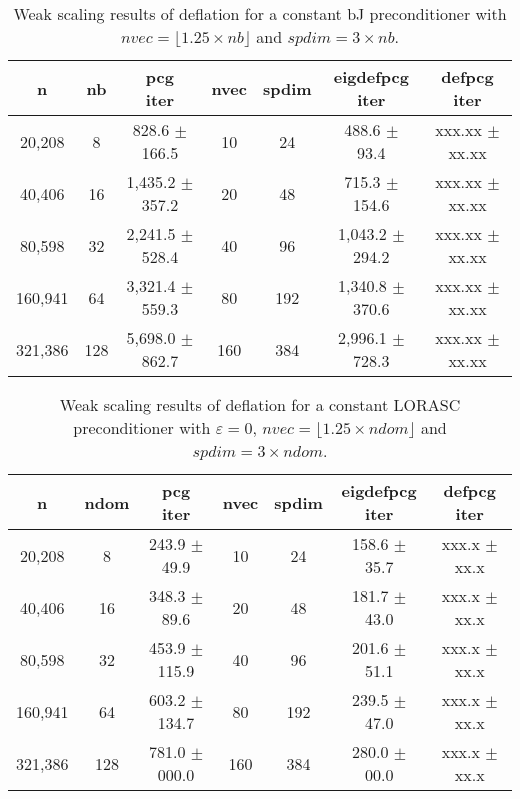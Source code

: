 \documentclass{article}
\begin{document}
\begin{table}[ht]
	\caption{Weak scaling results of deflation for a constant bJ preconditioner with $nvec=\lfloor1.25\times nb\rfloor$ and $spdim=3\times nb$.}
	\centering
	\begin{tabular}{|c|c|c|c|c|c|c|}
		\hline
		n & nb & \makecell{pcg\\ iter} & nvec & spdim & \makecell{eigdefpcg\\ iter} & \makecell{defpcg\\ iter}\\
		\hline
		20,208  &   8 &   828.6 $\pm$ 166.5 &  10 &  24 &   488.6 $\pm$  93.4 & xxx.xx $\pm$ xx.xx \\
		40,406  &  16 & 1,435.2 $\pm$ 357.2 &  20 &  48 &   715.3 $\pm$ 154.6 & xxx.xx $\pm$ xx.xx \\
		80,598  &  32 & 2,241.5 $\pm$ 528.4 &  40 &  96 & 1,043.2 $\pm$ 294.2 & xxx.xx $\pm$ xx.xx \\
		160,941 &  64 & 3,321.4 $\pm$ 559.3 &  80 & 192 & 1,340.8 $\pm$ 370.6 & xxx.xx $\pm$ xx.xx \\
		321,386 & 128 & 5,698.0 $\pm$ 862.7 & 160 & 384 & 2,996.1 $\pm$ 728.3 & xxx.xx $\pm$ xx.xx \\
		\hline
	\end{tabular}
	\label{Tab:005}
\end{table}


\begin{table}[ht]
\caption{Weak scaling results of deflation for a constant LORASC preconditioner with $\varepsilon=0$, $nvec=\lfloor1.25\times ndom\rfloor$ and $spdim=3\times ndom$.}
\centering
	\begin{tabular}{|c|c|c|c|c|c|c|}
	\hline
	n & ndom & \makecell{pcg\\ iter} & nvec & spdim & \makecell{eigdefpcg\\ iter} & \makecell{defpcg\\ iter}\\
	\hline
	20,208  &   8 & 243.9 $\pm$  49.9 &  10 &  24 & 158.6 $\pm$ 35.7 & xxx.x $\pm$ xx.x \\
	40,406  &  16 & 348.3 $\pm$  89.6 &  20 &  48 & 181.7 $\pm$ 43.0 & xxx.x $\pm$ xx.x \\
	80,598  &  32 & 453.9 $\pm$ 115.9 &  40 &  96 & 201.6 $\pm$ 51.1 & xxx.x $\pm$ xx.x \\
	160,941 &  64 & 603.2 $\pm$ 134.7 &  80 & 192 & 239.5 $\pm$ 47.0 & xxx.x $\pm$ xx.x \\
	321,386 & 128 & 781.0 $\pm$ 000.0 & 160 & 384 & 280.0 $\pm$ 00.0 & xxx.x $\pm$ xx.x \\
	\hline
\end{tabular}
\label{Tab:010}
\end{table}
\end{document}
